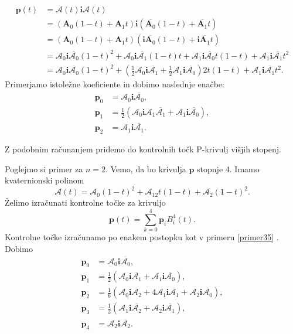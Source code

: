 \documentclass[mat1]{fmfdelo}
\newcommand{\ii}{\boldsymbol i}
\newcommand{\pp}{\boldsymbol p}
\newcommand{\A}{\mathcal A}
\begin{document}
\begin{primer}{\label{primer35}}
\begin{equation*}
\begin{split}
\pp(t) &= \A(t)\ii\overline{\A(t)} \\
&= (\boldsymbol{A}_0(1-t) + \boldsymbol{A}_1t) \ii ( \overline{\boldsymbol{A}_0}(1-t) + \overline{\boldsymbol{A}_1}t) \\
& = (\boldsymbol{A}_0(1-t) + \boldsymbol{A}_1t) (\ii\overline{\boldsymbol{A}_0}(1-t) + \ii\overline{\boldsymbol{A}_1}t) \\
&=\A_0 \ii \overline{\A_0} (1-t)^2 + \A_0\ii\overline{\A_1}(1-t)t + \A_1\ii\overline{\A_0}t(1-t) + \A_1\ii\overline{\A_1}t^2 \\
&= \A_0 \ii \overline{\A_0} (1-t)^2 + \left(\frac{1}{2}\A_0\ii\overline{\A_1} +\frac{1}{2} \A_1\ii\overline{\A_0}\right)2t(1-t) + \A_1\ii\overline{\A_1}t^2.
\end{split}
\end{equation*}
Primerjamo istoležne koeficiente in dobimo naslednje enačbe:
\begin{equation*}
\begin{split}
\pp_0&= \A_0\ii\overline{\A_0}, \\
\pp_1&= \frac{1}{2}\left( \A_0\ii\A_1\overline{\A_1} + \A_1\ii\overline{\A_0}\right),\\
\pp_2&= \A_1\ii\overline{\A_1}.
\end{split}
\end{equation*}
\end{primer}
Z podobnim računanjem pridemo do kontrolnih točk P-krivulj višjih stopenj.
\begin{primer}Poglejmo si primer za $n=2$. Vemo, da bo krivulja $\pp$ stopnje 4.
Imamo kvaternionski polinom
\begin{equation*}
	\A(t) = \A_0(1-t)^2 + \A_12t(1-t) + \A_2(1-t)^2.
\end{equation*}
Želimo izračunati kontrolne točke za krivuljo
\begin{equation*}
	\pp(t) = \sum_{k=0}^4\pp_iB_i^4(t).
\end{equation*}
Kontrolne točke izračunamo po enakem postopku kot v primeru \ref{primer35} . Dobimo
\begin{equation*}
\begin{split}
\pp_0 & = \A_0\ii\overline{\A_0}, \\
\pp_1 &= \frac{1}{2}\left( \A_0\ii\overline{\A_1} + \A_1\ii\overline{\A_0} \right), \\
\pp_2 &= \frac{1}{6} \left( \A_0\ii\overline{\A_2} + 4\A_1\ii\overline{\A_1}+\A_2\ii\overline{\A_0} \right), \\
\pp_3 &= \frac{1}{2} \left( \A_1\ii\overline{\A_2}+\A_2\ii\overline{\A_1} \right), \\
\pp_4 &= \A_2\ii\overline{\A_2}.
\end{split}
\end{equation*}
\end{primer}
\end{document}

